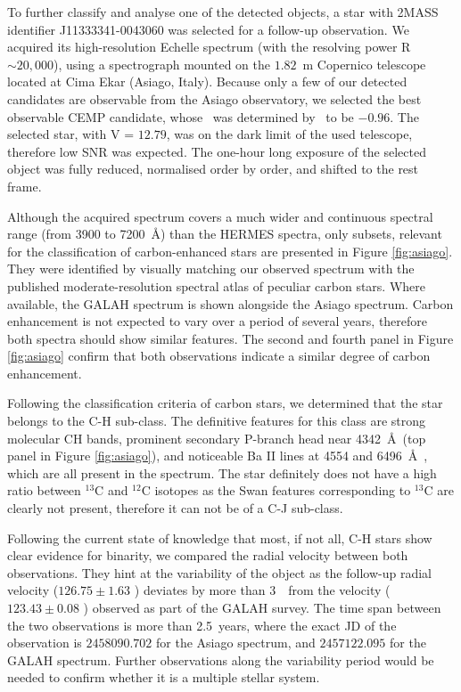 To further classify and analyse one of the detected objects, a star with 2MASS identifier J11333341-0043060 was selected for a follow-up observation. We acquired its high-resolution Echelle spectrum (with the resolving power R $\sim 20,000$), using a spectrograph mounted on the $1.82$~m Copernico telescope located at Cima Ekar (Asiago, Italy). Because only a few of our detected candidates are observable from the Asiago observatory, we selected the best observable CEMP candidate, whose \Feh\ was determined by \TC\ to be $-0.96$. The selected star, with V = $12.79$, was on the dark limit of the used telescope, therefore low SNR was expected. The one-hour long exposure of the selected object was fully reduced, normalised order by order, and shifted to the rest frame.

Although the acquired spectrum covers a much wider and continuous spectral range (from 3900 to 7200~\AA) than the HERMES spectra, only subsets, relevant for the classification of carbon-enhanced stars are presented in Figure \ref{fig:asiago}. They were identified by visually matching our observed spectrum with the published moderate-resolution spectral atlas \citep{1996ApJS..105..419B} of peculiar carbon stars. Where available, the GALAH spectrum is shown alongside the Asiago spectrum. Carbon enhancement is not expected to vary over a period of several years, therefore both spectra should show similar features. The second and fourth panel in Figure \ref{fig:asiago} confirm that both observations indicate a similar degree of carbon enhancement.

Following the classification criteria of carbon stars, we determined that the star belongs to the C-H sub-class. The definitive features for this class are strong molecular CH bands, prominent secondary P-branch head near 4342~\AA\ (top panel in Figure \ref{fig:asiago}), and noticeable Ba II lines at 4554 and 6496~\AA\ \citep{2018ApJS..234...31L}, which are all present in the spectrum. The star definitely does not have a high ratio between $^{13}$C and $^{12}$C isotopes as the Swan features corresponding to $^{13}$C are clearly not present, therefore it can not be of a C-J sub-class.

Following the current state of knowledge \citep{1990ApJ...352..709M, 2016AA...586A.158J, 2016ApJ...826...85S} that most, if not all, C-H stars show clear evidence for binarity, we compared the radial velocity between both observations. They hint at the variability of the object as the follow-up radial velocity ($126.75 \pm 1.63$ \kms) deviates by more than $3$~\kms\ from the velocity ($123.43 \pm 0.08$ \kms) observed as part of the GALAH survey. The time span between the two observations is more than 2.5~years, where the exact JD of the observation is $2458090.702$ for the Asiago spectrum, and $2457122.095$ for the GALAH spectrum. Further observations along the variability period would be needed to confirm whether it is a multiple stellar system.

